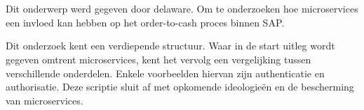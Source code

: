 
%
%

%



\chapter*{}


Dit onderwerp werd gegeven door delaware. Om te onderzoeken hoe microservices een invloed kan hebben op het order-to-cash proces binnen SAP. 

Dit onderzoek kent een verdiepende structuur. Waar in de start uitleg wordt gegeven omtrent microservices, kent het vervolg een vergelijking tussen verschillende onderdelen. Enkele voorbeelden hiervan zijn authenticatie en authorisatie. Deze scriptie sluit af met opkomende ideologieën en de bescherming van microservices.

